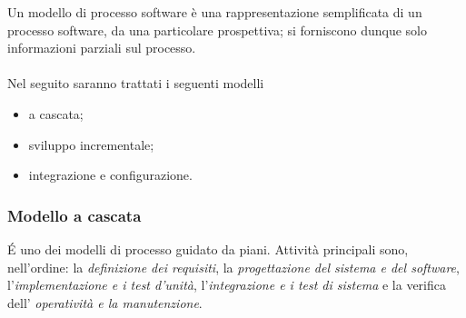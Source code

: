 \documentclass{subfiles}
\begin{document}
Un modello di processo software è una rappresentazione semplificata di un processo software, da una particolare prospettiva;
si forniscono dunque solo informazioni parziali sul processo.
\\ \\
Nel seguito saranno trattati i seguenti modelli
\begin{itemize}
    \item a cascata;
    \item sviluppo incrementale;
    \item integrazione e configurazione.
\end{itemize}

\subsubsection{Modello a cascata}
\'E uno dei modelli di processo guidato da piani.
Attività principali sono, nell'ordine: la \emph{definizione dei requisiti}, la \emph{progettazione del sistema e del software}, l'\emph{implementazione e i test d'unità},
l'\emph{integrazione e i test di sistema} e la verifica dell' \emph{operatività e la manutenzione}.
\end{document}
